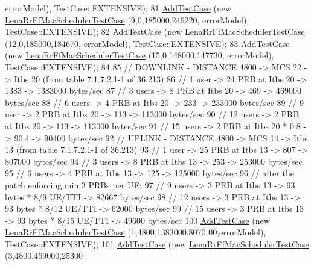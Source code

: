 \begin{DoxyCode}
      errorModel), TestCase::EXTENSIVE);
81   \hyperlink{classns3_1_1TestCase_a3718088e3eefd5d6454569d2e0ddd835}{AddTestCase} (\textcolor{keyword}{new} \hyperlink{classLenaRrFfMacSchedulerTestCase}{LenaRrFfMacSchedulerTestCase} (9,0,185000,246220,
      errorModel), TestCase::EXTENSIVE);
82   \hyperlink{classns3_1_1TestCase_a3718088e3eefd5d6454569d2e0ddd835}{AddTestCase} (\textcolor{keyword}{new} \hyperlink{classLenaRrFfMacSchedulerTestCase}{LenaRrFfMacSchedulerTestCase} (12,0,185000,184670,
      errorModel), TestCase::EXTENSIVE);
83   \hyperlink{classns3_1_1TestCase_a3718088e3eefd5d6454569d2e0ddd835}{AddTestCase} (\textcolor{keyword}{new} \hyperlink{classLenaRrFfMacSchedulerTestCase}{LenaRrFfMacSchedulerTestCase} (15,0,148000,147730,
      errorModel), TestCase::EXTENSIVE);
84 
85   \textcolor{comment}{// DOWNLINK - DISTANCE 4800 -> MCS 22 -> Itbs 20 (from table 7.1.7.2.1-1 of 36.213)}
86   \textcolor{comment}{// 1 user -> 24 PRB at Itbs 20 -> 1383 -> 1383000 bytes/sec}
87   \textcolor{comment}{// 3 users -> 8 PRB at Itbs 20 -> 469 -> 469000 bytes/sec}
88   \textcolor{comment}{// 6 users -> 4 PRB at Itbs 20 -> 233 -> 233000 bytes/sec}
89   \textcolor{comment}{// 9 user -> 2 PRB at Itbs 20 -> 113 -> 113000 bytes/sec}
90   \textcolor{comment}{// 12 users -> 2 PRB at Itbs 20 -> 113 -> 113000 bytes/sec}
91   \textcolor{comment}{// 15 users -> 2 PRB at Itbs 20 * 0.8 -> 90.4 -> 90400 bytes/sec}
92   \textcolor{comment}{// UPLINK - DISTANCE 4800 -> MCS 14 -> Itbs 13 (from table 7.1.7.2.1-1 of 36.213)}
93   \textcolor{comment}{// 1 user -> 25 PRB at Itbs 13 -> 807 -> 807000 bytes/sec}
94   \textcolor{comment}{// 3 users -> 8 PRB at Itbs 13 -> 253 -> 253000 bytes/sec}
95   \textcolor{comment}{// 6 users -> 4 PRB at Itbs 13 -> 125 -> 125000 bytes/sec}
96   \textcolor{comment}{// after the patch enforcing min 3 PRBs per UE:}
97   \textcolor{comment}{// 9 users -> 3 PRB at Itbs 13 -> 93  bytes * 8/9 UE/TTI  -> 82667 bytes/sec}
98   \textcolor{comment}{// 12 users -> 3 PRB at Itbs 13 -> 93  bytes * 8/12 UE/TTI  -> 62000 bytes/sec}
99   \textcolor{comment}{// 15 users -> 3 PRB at Itbs 13 -> 93  bytes * 8/15 UE/TTI  -> 49600 bytes/sec}
100   \hyperlink{classns3_1_1TestCase_a3718088e3eefd5d6454569d2e0ddd835}{AddTestCase} (\textcolor{keyword}{new} \hyperlink{classLenaRrFfMacSchedulerTestCase}{LenaRrFfMacSchedulerTestCase} (1,4800,1383000,8070
      00,errorModel), TestCase::EXTENSIVE);
101   \hyperlink{classns3_1_1TestCase_a3718088e3eefd5d6454569d2e0ddd835}{AddTestCase} (\textcolor{keyword}{new} \hyperlink{classLenaRrFfMacSchedulerTestCase}{LenaRrFfMacSchedulerTestCase} (3,4800,469000,25300

\end{DoxyCode}
